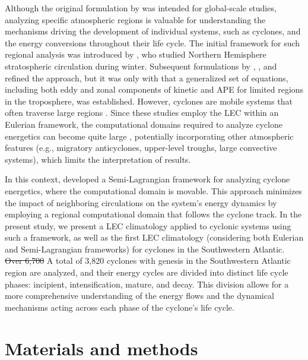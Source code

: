 \documentclass[pdflatex,sn-chicago]{sn-jnl}%
\makeatletter
\theoremstyle{plain}
\theoremstyle{definition}
\theoremstyle{remark}
\theoremstyle{definition}
\providecommand{\DIFaddtex}[1]{{\protect\color{blue}#1}} %
\providecommand{\DIFdeltex}[1]{{\protect\color{red}\sout{#1}}} %
\providecommand{\DIFaddbegin}{} %
\providecommand{\DIFaddend}{} %
\providecommand{\DIFdelbegin}{} %
\providecommand{\DIFdelend}{} %
\providecommand{\DIFadd}[1]{\texorpdfstring{\DIFaddtex{#1}}{#1}} %
\providecommand{\DIFdel}[1]{\texorpdfstring{\DIFdeltex{#1}}{}} %
\let\sout@orig\sout %
\renewcommand{\sout}[1]{\ifmmode\text{\sout@orig{\ensuremath{#1}}}\else\sout@orig{#1}\fi} %
\makeatother
\begin{document}
Although the original formulation by \citet{lorenz1967nature} was intended for global-scale studies, analyzing specific atmospheric regions is valuable for understanding the mechanisms driving the development of individual systems, such as cyclones, and the energy conversions throughout their life cycle. The initial framework for such regional analysis was introduced by \citet{muench1965dynamics}, who studied Northern Hemisphere stratospheric circulation during winter. Subsequent formulations by \citet{dutton1967theory}, \citet{vincent1973some}, and \citet{smith1980energetics} refined the approach, but it was only with \citet{brennan1980zonal} that a generalized set of equations, including both eddy and zonal components of kinetic and APE for limited regions in the troposphere, was established. However, cyclones are mobile systems that often traverse large regions \citep[e.g.]{hoskins2002new,couto2024new}. Since these studies employ the LEC within an Eulerian framework, the computational domains required to analyze cyclone energetics can become quite large \citep[e.g.]{black2013universal}, potentially incorporating other atmospheric features (e.g., migratory anticyclones, upper-level troughs, large convective systems), which limits the interpretation of results.

In this context, \citet{michaelides1999quasi} developed a Semi-Lagrangian framework for analyzing cyclone energetics, where the computational domain is movable. This approach minimizes the impact of neighboring circulations on the system's energy dynamics by employing a regional computational domain that follows the cyclone track. In the present study, we present a LEC climatology applied to cyclonic systems using such a framework, as well as the first LEC climatology (considering both Eulerian and Semi-Lagrangian frameworks) for cyclones in the Southwestern Atlantic. \DIFdelbegin \DIFdel{Over 6,700 }\DIFdelend \DIFaddbegin \DIFadd{A total of 3,820 }\DIFaddend cyclones with genesis in the Southwestern Atlantic region are analyzed, and their energy cycles are divided into distinct life cycle phases: incipient, intensification, mature, and decay. This division allows for a more comprehensive understanding of the energy flows and the dynamical mechanisms acting across each phase of the cyclone's life cycle.

\section{Materials and methods}
\end{document}
